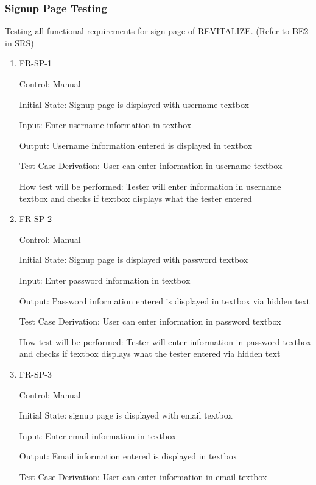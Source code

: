\documentclass[12pt, titlepage]{article}
\begin{document}
\subsubsection{Signup Page Testing}

Testing all functional requirements for sign page of REVITALIZE. (Refer to BE2 in SRS)

\begin{enumerate}

\item{FR-SP-1\\}

Control: Manual
					
Initial State: Signup page is displayed with username textbox
					
Input: Enter username information in textbox
					
Output: Username information entered is displayed in textbox

Test Case Derivation: User can enter information in username textbox

How test will be performed: Tester will enter information in username textbox and checks if textbox displays what the tester entered
					
\item{FR-SP-2 \\}

Control: Manual
					
Initial State: Signup page is displayed with password textbox
					
Input: Enter password information in textbox
					
Output: Password information entered is displayed in textbox via hidden text

Test Case Derivation: User can enter information in password textbox

How test will be performed: Tester will enter information in password textbox and checks if textbox displays what the tester entered via hidden text

\item{FR-SP-3\\}

Control: Manual
					
Initial State: signup page is displayed with email textbox
					
Input: Enter email information in textbox
					
Output: Email information entered is displayed in textbox

Test Case Derivation: User can enter information in email textbox


\end{enumerate}
\end{document}
